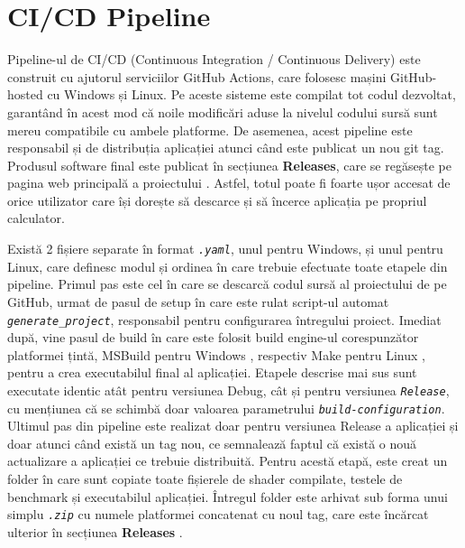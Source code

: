 \section{CI/CD Pipeline}
Pipeline-ul de CI/CD (Continuous Integration / Continuous Delivery) este construit cu ajutorul serviciilor GitHub Actions, care folosesc mașini GitHub-hosted cu Windows și Linux. Pe aceste sisteme este compilat tot codul dezvoltat, garantând în acest mod că noile modificări aduse la nivelul codului sursă sunt mereu compatibile cu ambele platforme. De asemenea, acest pipeline este responsabil și de distribuția aplicației atunci când este publicat un nou git tag. Produsul software final este publicat în secțiunea \textbf{Releases}, care se regăsește pe pagina web principală a proiectului \cite{ReleasesURL_citation}. Astfel, totul poate fi foarte ușor accesat de orice utilizator care își dorește să descarce și să încerce aplicația pe propriul calculator. 

Există 2 fișiere separate în format \textit{\texttt{.yaml}}, unul pentru Windows, și unul pentru Linux, care definesc modul și ordinea în care trebuie efectuate toate etapele din pipeline. Primul pas este cel în care se descarcă codul sursă al proiectului de pe GitHub, urmat de pasul de setup în care este rulat script-ul automat \textit{\texttt{generate\_project}}, responsabil pentru configurarea întregului proiect. Imediat după, vine pasul de build în care este folosit build engine-ul corespunzător platformei țintă, MSBuild pentru Windows \cite{MSBuild_citation}, respectiv Make pentru Linux \cite{Make_citation}, pentru a crea executabilul final al aplicației. Etapele descrise mai sus sunt executate identic atât pentru versiunea Debug, cât și pentru versiunea \textit{\texttt{Release}}, cu mențiunea că se schimbă doar valoarea parametrului \textit{\texttt{build-configuration}}. Ultimul pas din pipeline este realizat doar pentru versiunea Release a aplicației și doar atunci când există un tag nou, ce semnalează faptul că există o nouă actualizare a aplicației ce trebuie distribuită. Pentru acestă etapă, este creat un folder în care sunt copiate toate fișierele de shader compilate, testele de benchmark și executabilul aplicației. Întregul folder este arhivat sub forma unui simplu \textit{\texttt{.zip}} cu numele platformei concatenat cu noul tag, care este încărcat ulterior în secțiunea \textbf{Releases} \cite{ReleasesURL_citation}.





